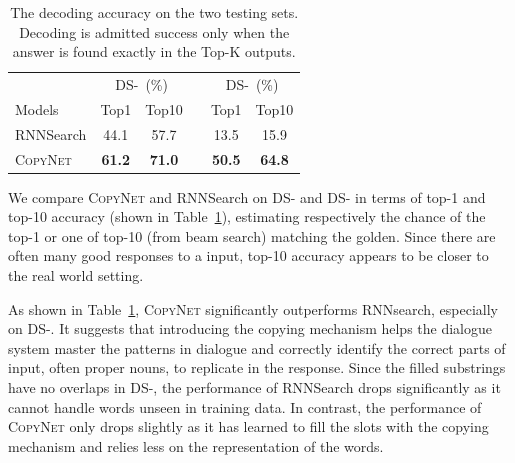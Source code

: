 \begin{table}[!ht] %
\small
\centering
\begin{tabular}{lccccc}
\toprule
 &\multicolumn{2}{c}{DS-\uppercase\expandafter{\romannumeral1}~(\%)}
 && \multicolumn{2}{c}{DS-\uppercase\expandafter{\romannumeral2}~(\%)}\\
\cmidrule{2-3}\cmidrule{5-6}
Models &Top1&Top10 &&Top1 &Top10	\\
\midrule
RNNSearch &  44.1 & 57.7 && 13.5 & 15.9 \\
\textsc{CopyNet} & \textbf{61.2} & \textbf{71.0}  && \textbf{50.5} & \textbf{64.8} \\										  
\bottomrule
\end{tabular} \vspace{-5pt}
\caption{\label{table-ds} The decoding accuracy on the two testing sets. Decoding is admitted success only when the answer is found exactly in the Top-K outputs. }
\vspace{-8pt}
\end{table} 
We compare \textsc{CopyNet} and RNNSearch on DS-\uppercase\expandafter{} and  DS-\uppercase\expandafter{} in terms of top-1 and top-10 accuracy (shown in Table~\ref{table-ds}), estimating respectively the chance of the top-1 or one of top-10 (from beam search) matching the golden. Since there are often many good responses to a input, top-10 accuracy appears to be closer to the real world setting. 

As shown in Table~\ref{table-ds}, \textsc{CopyNet} significantly  outperforms RNNsearch, especially on DS-\uppercase\expandafter{}. It suggests that introducing the copying mechanism helps the dialogue system master the patterns in dialogue and correctly identify the correct parts of input, often proper nouns, to replicate in the response. Since the filled substrings have no overlaps in DS-\uppercase\expandafter{}, the performance of RNNSearch drops significantly as it cannot handle words unseen in training data. In contrast, the performance of \textsc{CopyNet} only drops slightly as it has learned to fill the slots with the copying mechanism and relies less on the representation of the words.

